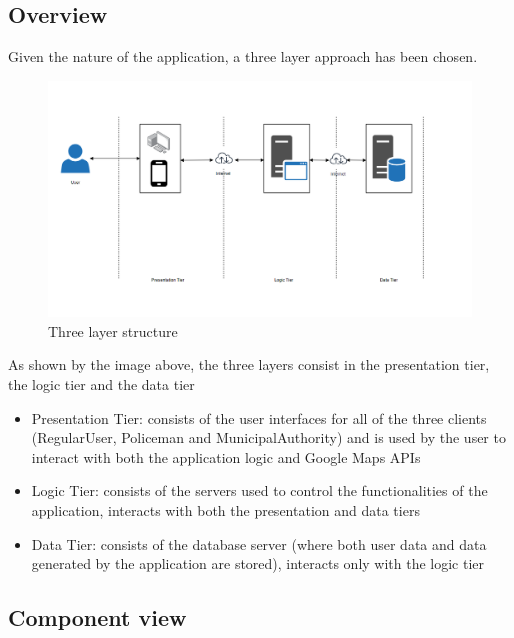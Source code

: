 \subsection{Overview}
Given the nature of the application, a three layer approach has been chosen.\newline
\begin{figure}[h!]
	\centering
	\includegraphics[width=\textwidth]{Images/three_layer}
	\caption{Three layer structure}
\end{figure}
\newline
As shown by the image above, the three layers consist in the presentation tier, the logic tier and the data tier
\begin{itemize}
\item Presentation Tier: consists of the user interfaces for all of the three clients (RegularUser, Policeman and MunicipalAuthority) and is used by the user to interact with both the application logic and Google Maps APIs \newline
\item Logic Tier: consists of the servers used to control the functionalities of the application, interacts with both the presentation and data tiers \newline
\item Data Tier: consists of the database server (where both user data and data generated by the application are stored), interacts only with the logic tier \newline
\end{itemize}
\newpage
\subsection{Component view}
